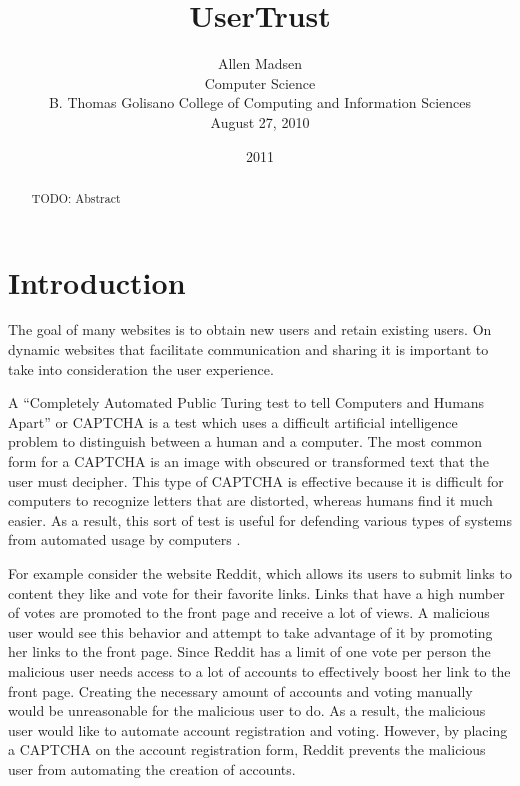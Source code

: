 \documentclass[journal, 12pt, onecolumn, draftclsnofoot]{IEEEtran}
\begin{document}
\title{\Large\bf UserTrust}
\date{2011}
\author{Allen Madsen \\ Computer Science \\ B. Thomas Golisano College of Computing and Information Sciences \\ August 27, 2010
}
\maketitle
\thispagestyle{empty}

\newpage

\begin{abstract}

TODO: Abstract

\nocite{*}

\end{abstract}

\section{Introduction}
\label{Introduction}

The goal of many websites is to obtain new users and retain existing users. On dynamic websites that facilitate communication and sharing it is important to take into consideration the user experience.




A “Completely Automated Public Turing test to tell Computers and Humans Apart” or CAPTCHA is a test which uses a difficult artificial intelligence problem to distinguish between a human and a computer. The most common form for a CAPTCHA is an image with obscured or transformed text that the user must decipher. This type of CAPTCHA is effective because it is difficult for computers to recognize letters that are distorted, whereas humans find it much easier. As a result, this sort of test is useful for defending various types of systems from automated usage by computers \cite{vonahn}.

For example consider the website Reddit, which allows its users to submit links to content they like and vote for their favorite links. Links that have a high number of votes are promoted to the front page and receive a lot of views. A malicious user would see this behavior and attempt to take advantage of it by promoting her links to the front page. Since Reddit has a limit of one vote per person the malicious user needs access to a lot of accounts to effectively boost her link to the front page. Creating the necessary amount of accounts and voting manually would be unreasonable for the malicious user to do. As a result, the malicious user would like to automate account registration and voting. However, by placing a CAPTCHA on the account registration form, Reddit prevents the malicious user from automating the creation of accounts.
\end{document}
